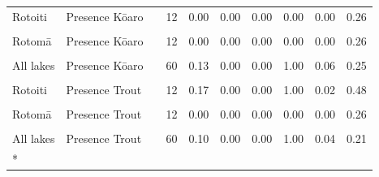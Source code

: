 \documentclass[
  12pt,
  a4paper,
  oneside]{scrbook}
\begin{document}
\begin{longtable}[t]{lllrrrrrrr}
Rotoiti & Presence Kōaro &  & 12 & 0.00 & 0.00 & 0.00 & 0.00 & 0.00 & 0.26\\
\cellcolor{gray!8}{Rotoehu} & \cellcolor{gray!8}{Presence Kōaro} & \cellcolor{gray!8}{} & \cellcolor{gray!8}{12} & \cellcolor{gray!8}{0.00} & \cellcolor{gray!8}{0.00} & \cellcolor{gray!8}{0.00} & \cellcolor{gray!8}{0.00} & \cellcolor{gray!8}{0.00} & \cellcolor{gray!8}{0.26}\\
Rotomā & Presence Kōaro &  & 12 & 0.00 & 0.00 & 0.00 & 0.00 & 0.00 & 0.26\\
\cellcolor{gray!8}{Ōkāreka} & \cellcolor{gray!8}{Presence Kōaro} & \cellcolor{gray!8}{} & \cellcolor{gray!8}{12} & \cellcolor{gray!8}{0.67} & \cellcolor{gray!8}{1.00} & \cellcolor{gray!8}{0.00} & \cellcolor{gray!8}{1.00} & \cellcolor{gray!8}{0.35} & \cellcolor{gray!8}{0.90}\\
\addlinespace
All lakes & Presence Kōaro &  & 60 & 0.13 & 0.00 & 0.00 & 1.00 & 0.06 & 0.25\\
\cellcolor{gray!8}{Rotorua} & \cellcolor{gray!8}{Presence Trout} & \cellcolor{gray!8}{} & \cellcolor{gray!8}{12} & \cellcolor{gray!8}{0.17} & \cellcolor{gray!8}{0.00} & \cellcolor{gray!8}{0.00} & \cellcolor{gray!8}{1.00} & \cellcolor{gray!8}{0.02} & \cellcolor{gray!8}{0.48}\\
Rotoiti & Presence Trout &  & 12 & 0.17 & 0.00 & 0.00 & 1.00 & 0.02 & 0.48\\
\cellcolor{gray!8}{Rotoehu} & \cellcolor{gray!8}{Presence Trout} & \cellcolor{gray!8}{} & \cellcolor{gray!8}{12} & \cellcolor{gray!8}{0.00} & \cellcolor{gray!8}{0.00} & \cellcolor{gray!8}{0.00} & \cellcolor{gray!8}{0.00} & \cellcolor{gray!8}{0.00} & \cellcolor{gray!8}{0.26}\\
Rotomā & Presence Trout &  & 12 & 0.00 & 0.00 & 0.00 & 0.00 & 0.00 & 0.26\\
\addlinespace
\cellcolor{gray!8}{Ōkāreka} & \cellcolor{gray!8}{Presence Trout} & \cellcolor{gray!8}{} & \cellcolor{gray!8}{12} & \cellcolor{gray!8}{0.17} & \cellcolor{gray!8}{0.00} & \cellcolor{gray!8}{0.00} & \cellcolor{gray!8}{1.00} & \cellcolor{gray!8}{0.02} & \cellcolor{gray!8}{0.48}\\
All lakes & Presence Trout &  & 60 & 0.10 & 0.00 & 0.00 & 1.00 & 0.04 & 0.21\\*

\end{longtable}

\endgroup{}

\clearpage
\renewcommand{\thetable}{S5.\arabic{table}}
\renewcommand{\thefigure}{S5.\arabic{figure}}
\setcounter{table}{0}
\setcounter{figure}{0}
\end{document}

